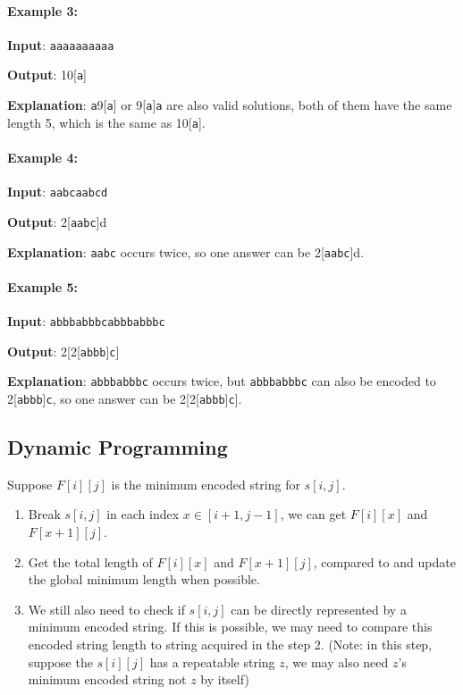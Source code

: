 \paragraph{Example 3:}

\begin{flushleft}

\textbf{Input}: \texttt{aaaaaaaaaa}

\textbf{Output}: 10[\texttt{a}]

\textbf{Explanation}: \texttt{a}9[\texttt{a}] or 9[\texttt{a}]\texttt{a} are also valid solutions, both of them have the same length  5, which is the same as 10[\texttt{a}].

\end{flushleft}
\paragraph{Example 4:}

\begin{flushleft}

\textbf{Input}: \texttt{aabcaabcd}

\textbf{Output}: 2[\texttt{aabc}]d

\textbf{Explanation}: \texttt{aabc} occurs twice, so one answer can be 2[\texttt{aabc}]d.

\end{flushleft}
\paragraph{Example 5:}

\begin{flushleft}
\textbf{Input}: \texttt{abbbabbbcabbbabbbc}

\textbf{Output}: 2[2[\texttt{abbb}]\texttt{c}]

\textbf{Explanation}: \texttt{abbbabbbc} occurs twice, but \texttt{abbbabbbc} can also be encoded to 2[\texttt{abbb}]\texttt{c}, so one answer can be 2[2[\texttt{abbb}]\texttt{c}].
\end{flushleft}


\subsection{Dynamic Programming}
Suppose $F[i][j]$ is the minimum encoded string for $s[i,j]$. 

\begin{enumerate}
\item Break $s[i,j]$ in each index $x\in [i+1, j-1]$, we can get $F[i][x]$ and $F[x+1][j]$. 
\item Get the total length of $F[i][x]$ and $F[x+1][j]$, compared to and update the global minimum length when possible. 
\item We still also need to check if $s[i,j]$ can be directly represented by a minimum encoded string. If this is possible, we may need to compare this encoded string length to string acquired in the step 2. (Note: in this step, suppose the $s[i][j]$ has a repeatable string $z$, we may also need $z$'s minimum encoded string not $z$ by itself)
\end{enumerate}

